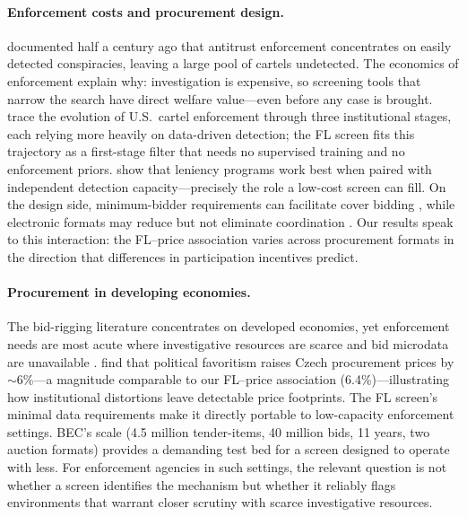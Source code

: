 \paragraph{Enforcement costs and procurement design.}
\citet{posner1970statistical} documented half a century ago that
antitrust enforcement concentrates on easily detected
conspiracies, leaving a large pool of cartels undetected. The
economics of enforcement \citep{becker1968crime,
polinsky2000economics} explain why: investigation is expensive, so
screening tools that narrow the search have direct welfare
value---even before any case is brought.
\citet{ghosal2014cartel} trace the evolution of U.S.\ cartel
enforcement through three institutional stages, each relying more
heavily on data-driven detection; the FL screen fits this trajectory
as a first-stage filter that needs no supervised training and no
enforcement priors. \citet{harrington2015leniency} show that
leniency programs work best when paired with independent detection
capacity---precisely the role a low-cost screen can fill.
On the design side, minimum-bidder requirements can facilitate cover
bidding \citep{athey2011comparing}, while electronic formats may
reduce but not eliminate coordination
\citep{bajari2009auctions}. Our results speak to this interaction:
the FL--price association varies across procurement formats in the
direction that differences in participation incentives predict.

\paragraph{Procurement in developing economies.}
The bid-rigging literature concentrates on developed economies, yet
enforcement needs are most acute where investigative resources are
scarce and bid microdata are unavailable
\citep{sanchezgraells2019screening}. \citet{baranek2024favoritism} find that political favoritism raises
Czech procurement prices by $\sim$6\%---a magnitude comparable to our
FL--price association (6.4\%)---illustrating how institutional
distortions leave detectable price footprints. The FL screen's
minimal data requirements make it directly portable to low-capacity
enforcement settings. BEC's scale (4.5 million tender-items, 40 million bids,
11 years, two auction formats) provides a demanding test bed for a
screen designed to operate with less. For enforcement agencies in
such settings, the relevant question is not whether a screen
identifies the mechanism but whether it reliably flags environments
that warrant closer scrutiny with scarce investigative resources.
